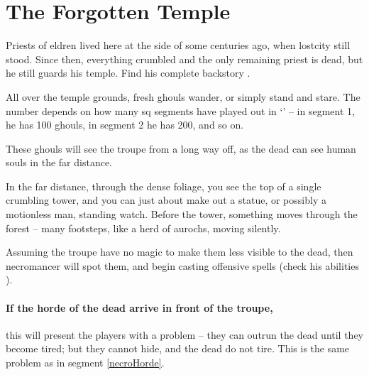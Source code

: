 \section{The Forgotten Temple}
\label{necromancers_lair}

\begin{multicols}{2}


\noindent
Priests of \gls{eldren} lived here at the side of  some centuries ago, when \gls{lostcity} still stood.
Since then, everything crumbled and the only remaining priest is dead, but he still guards his temple.
Find his complete backstory .

All over the temple grounds, fresh ghouls wander, or simply stand and stare.
The number depends on how many \gls{sq} \glspl{segment} have played out in `' -- in \gls{segment} 1, he has 100 ghouls, in \gls{segment} 2 he has 200, and so on.

These ghouls will see the troupe from a long way off, as the dead can see human souls in the far distance.

\begin{boxtext}
  In the far distance, through the dense foliage, you see the top of a single crumbling tower, and you can just about make out a statue, or possibly a motionless man, standing watch.
  Before the tower, something moves through the forest -- many footsteps, like a herd of aurochs, moving silently.
\end{boxtext}

Assuming the troupe have no magic to make them less visible to the dead, then \gls{necromancer} will spot them, and begin casting offensive spells (check his abilities ).

\paragraph{If the horde of the dead arrive in front of the troupe,}
this will present the players with a problem -- they can outrun the dead until they become tired; but they cannot hide, and the dead do not tire.
This is the same problem as in \gls{segment} \vref{necroHorde}.


\end{multicols}
